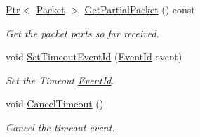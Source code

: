 \begin{DoxyCompactItemize}
\hyperlink{classns3_1_1Ptr}{Ptr}$<$ \hyperlink{classns3_1_1Packet}{Packet} $>$ \hyperlink{classns3_1_1Ipv6ExtensionFragment_1_1Fragments_aa3e7ed0d1458526ff565403b1b8e4285}{Get\+Partial\+Packet} () const 
\begin{DoxyCompactList}\small\item\em Get the packet parts so far received. \end{DoxyCompactList}\item 
void \hyperlink{classns3_1_1Ipv6ExtensionFragment_1_1Fragments_a04cc1aa63910ea9214a0992db8cfec2e}{Set\+Timeout\+Event\+Id} (\hyperlink{classns3_1_1EventId}{Event\+Id} event)
\begin{DoxyCompactList}\small\item\em Set the Timeout \hyperlink{classns3_1_1EventId}{Event\+Id}. \end{DoxyCompactList}\item 
void \hyperlink{classns3_1_1Ipv6ExtensionFragment_1_1Fragments_aa7e326cb73365750954b9b01377287a2}{Cancel\+Timeout} ()
\begin{DoxyCompactList}\small\item\em Cancel the timeout event. \end{DoxyCompactList}\end{DoxyCompactItemize}
